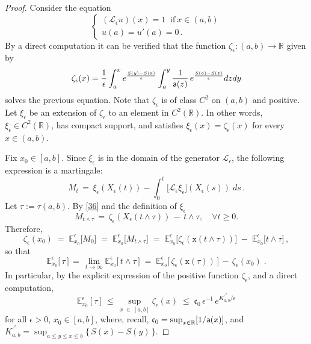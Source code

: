 \documentclass[reqno]{amsart}
\theoremstyle{plain}
\theoremstyle{definition}
\newcommand{\mf}[1]{{\mathfrak #1}}
\newcommand{\bb}[1]{{\mathbb #1}}
\newcommand{\ms}[1]{{\mathscr #1}}
\newcommand{\mss}[1]{{\textsf #1}}
\newcommand{\mtt}[1]{{\mathtt #1}}
\newcounter{as}[section]
\newcommand{\<}{\langle}
\renewcommand{\>}{\rangle}
\begin{document}
\begin{proof}
Consider the equation
\begin{equation}
\label{36}
\begin{cases} (\ms L_{\epsilon}u)(x) = 1 \;\; \text{if}\ x\in (a, b)
\\
u(a) = u'(a) = 0\, .
\end{cases}
\end{equation}
By a direct computation it can be verified that the function
$\zeta_{\epsilon}: (a, b) \to \bb R$ given by
\begin{equation}
\label{40}
\zeta_{\epsilon}(x) =
\frac{1}{\epsilon}\int_{a}^{x}e^{\frac{S(y)-S(a)}{\epsilon}}
\int_{a}^{y} \frac{1}{\mss a (z)} \, e^{\frac{S(a)-S(z)}{\epsilon}}dzdy
\end{equation}
solves the previous equation. Note that $\zeta_{\epsilon}$ is of class
$C^{2}$ on $(a, b)$ and positive. Let $\xi_{\epsilon}$ be an extension
of $\zeta_{\epsilon}$ to an element in $C^{2}(\bb R)$. In other words,
$\xi_\epsilon \in C^{2}(\bb R)$, has compact support, and satisfies
$\xi_{\epsilon}(x) = \zeta_{\epsilon}(x)$ for every $x\in (a, b)$.

Fix $x_{0}\in [a, b]$.  Since $\xi_\epsilon$ is in the domain of
the generator $\ms L_{\epsilon}$, the following expression is a
martingale:
\begin{equation*}
M_{t} \,=\, \xi_{\epsilon}(X_{\epsilon} (t)) -
\int_{0}^{t}\ms [\ms
L_{\epsilon}\xi_{\epsilon}](X_{\epsilon} (s)) \; ds\,.
\end{equation*}
Let $\tau := \tau(a,b)$. By \eqref{36} and the definition of
$\xi_{\epsilon}$
\begin{equation*}
M_{t\wedge \tau} \,=\,
\zeta_{\epsilon}(X_{\epsilon}(t\wedge \tau)) \,-\,  t\wedge
\tau, \quad\forall t\geq 0.
\end{equation*}
Therefore,
\begin{equation*}
\zeta_{\epsilon}(x_0) \; = \; \bb
E^\epsilon_{x_0}\big[M_{0}\big] \; = \; \bb
E^\epsilon_{x_0}\big[M_{t\wedge \tau}\big]
\;=\; \bb E^\epsilon_{x_{0}}\big[\zeta_{\epsilon}(\mtt x (t\wedge
\tau))\big] \;-\; \bb
E^\epsilon_{x_{0}}\big[t\wedge \tau\big]\, ,
\end{equation*}
so that
\begin{equation}
\label{10}
\bb E^\epsilon_{x_{0}} \big[ \, \tau \,\big ] 
\,=\, \lim_{t\to\infty}
\bb E^\epsilon_{x_{0}} \big[\, t \wedge \tau
\, \big]  \; = \;
\bb E^\epsilon_{x_{0}}\big[\, \zeta_{\epsilon}(
\mtt x(\tau)) \, \big] \,-\,  \zeta_{\epsilon}(x_0) \;.
\end{equation}
In particular, by the explicit expression of the positive function
$\zeta_{\epsilon}$, and a direct computation, 
\begin{equation*}
\bb E^\epsilon_{x_{0}} [\tau ]   \,\leq\,
\sup_{x\;\in\; [a, b]} \zeta_{\epsilon}(x) \;
\le \; \mf c_0 \, \epsilon^{-1}\, e^{K^{^\nearrow}_{a,b}/\epsilon} 
\end{equation*}
for all $\epsilon>0$, $x_0\in [a,b]$, where, recall,
$\mf c_0 = \sup_{x\in \bb R} [1/\mss a(x)]$, and
$K^{^\nearrow}_{a,b} = \sup_{a \le y\le x \le b} \{\, S(x)-S(y)\,\}$.


\end{proof}
\end{document}
